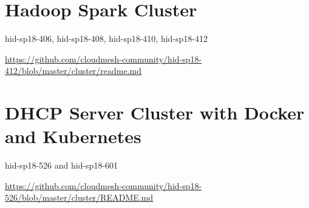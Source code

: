 \section{Hadoop Spark Cluster }

hid-sp18-406,  hid-sp18-408, hid-sp18-410, hid-sp18-412

\url{https://github.com/cloudmesh-community/hid-sp18-412/blob/master/cluster/readme.md}

 

\section{DHCP Server Cluster with Docker and Kubernetes }

hid-sp18-526 and hid-sp18-601

\url{https://github.com/cloudmesh-community/hid-sp18-526/blob/master/cluster/README.md}


